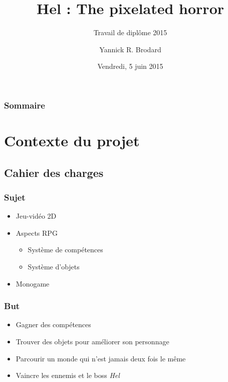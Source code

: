 \documentclass{beamer}
\title[Hel : The pixelated horror]{Hel : The pixelated horror}
\subtitle{Travail de diplôme 2015}
\author{Yannick R. Brodard}
\institute{Centre de Formation Professionnelle Technique\\École d'informatique}
\date{Vendredi, 5 juin 2015}
\begin{document}
\frame{\titlepage}

\begin{frame}
\frametitle{Sommaire}
\tableofcontents[hideallsubsections]
\end{frame}


\section{Contexte du projet}
\subsection{Cahier des charges}
\begin{frame}
\frametitle{Sujet}
\begin{itemize}
	\item Jeu-vidéo 2D
	\item Aspects RPG
	\begin{itemize}
		\item Système de compétences
		\item Système d'objets
	\end{itemize}
	\item Monogame
\end{itemize}
\end{frame}

\begin{frame}
\frametitle{But}
\begin{itemize}
	\item Gagner des compétences
	\item Trouver des objets pour améliorer son personnage
	\item Parcourir un monde qui n'est jamais deux fois le même
	\item Vaincre les ennemis et le boss \textit{Hel}
\end{itemize}
\end{frame}
\end{document}
